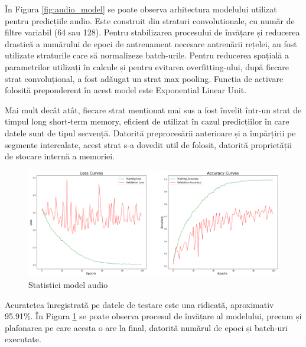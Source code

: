 \documentclass[a4paper, 12pt]{report}
\begin{document}
 	În Figura \ref{fig:audio_model} se poate observa arhitectura modelului utilizat pentru predicțiile audio. Este construit din straturi convolutionale, cu număr de filtre variabil (64 sau 128). Pentru stabilizarea procesului de învățare și reducerea drastică a numărului de epoci de antrenament necesare antrenării rețelei, au fost utilizate straturile care să normalizeze batch-urile. Pentru reducerea spațială a parametrilor utilizați în calcule și pentru evitarea overfitting-ului, după fiecare strat convoluțional, a fost adăugat un strat max pooling. Funcția de activare folosită preponderent în acest model este Exponential Linear Unit. 
 	
 	Mai mult decât atât, fiecare strat menționat mai sus a fost învelit într-un strat de timpul long short-term memory, eficient de utilizat în cazul predicțiilor în care datele sunt de tipul secvență. Datorită preprocesării anterioare și a împărțirii pe segmente intercalate, acest strat s-a dovedit util de folosit, datorită proprietății de stocare internă a memoriei.
	
	\begin{figure}[H]
		\begin{center}
			\includegraphics[scale=0.2]{images/accuracy_audio_model.png}
		\end{center}
		\caption{Statistici model audio}
		\label{fig:audio_model_accuracy}
	\end{figure}
	
	Acuratețea înregistrată pe datele de testare este una ridicată, aproximativ 95.91\%. În Figura \ref{fig:audio_model_accuracy} se poate observa procesul de învățare al modelului, precum și plafonarea pe care acesta o are la final, datorită numărul de epoci și batch-uri executate.
	
\end{document}
